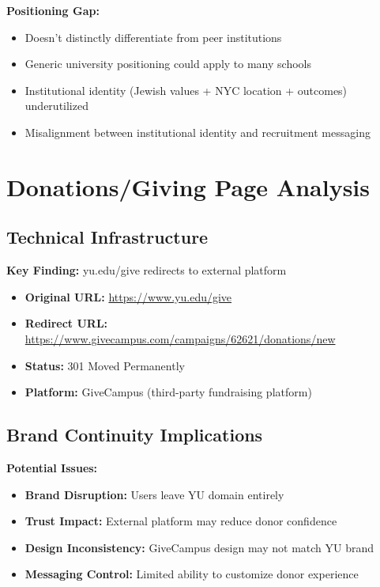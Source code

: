 \documentclass[12pt,letterpaper]{article}
\begin{document}
\textbf{Positioning Gap:}
\begin{itemize}[leftmargin=*]
    \item Doesn't distinctly differentiate from peer institutions
    \item Generic university positioning could apply to many schools
    \item Institutional identity (Jewish values + NYC location + outcomes) underutilized
    \item Misalignment between institutional identity and recruitment messaging
\end{itemize}

\section{Donations/Giving Page Analysis}

\subsection{Technical Infrastructure}

\textbf{Key Finding:} yu.edu/give redirects to external platform

\begin{itemize}[leftmargin=*]
    \item \textbf{Original URL:} \url{https://www.yu.edu/give}
    \item \textbf{Redirect URL:} \url{https://www.givecampus.com/campaigns/62621/donations/new}
    \item \textbf{Status:} 301 Moved Permanently
    \item \textbf{Platform:} GiveCampus (third-party fundraising platform)
\end{itemize}

\subsection{Brand Continuity Implications}

\textbf{Potential Issues:}
\begin{itemize}[leftmargin=*]
    \item \textbf{Brand Disruption:} Users leave YU domain entirely
    \item \textbf{Trust Impact:} External platform may reduce donor confidence
    \item \textbf{Design Inconsistency:} GiveCampus design may not match YU brand
    \item \textbf{Messaging Control:} Limited ability to customize donor experience
\end{itemize}
\end{document}
